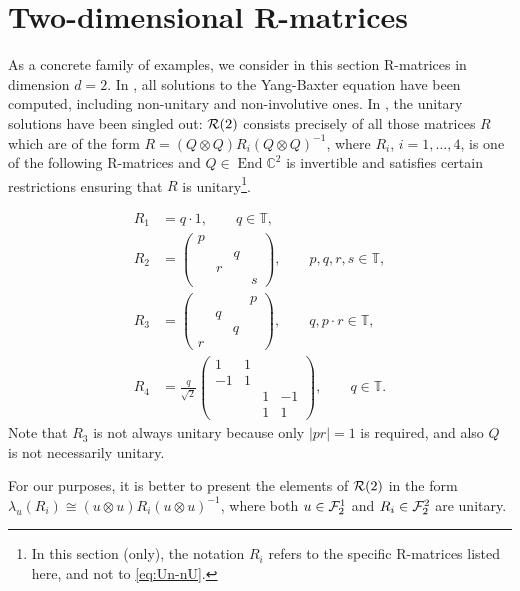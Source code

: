 \documentclass[12pt,a4paper]{amsart}
\numberwithin{equation}{section}
\theoremstyle{remark}
\def\End{\operatorname{End}}
\newcommand{\ot}{\otimes}
\def\C{\mathbb{C}}
\def\T{\mathbb{T}}
\newcommand{\la}{\lambda}
\begin{document}
\section{Two-dimensional R-matrices}\label{section:2dRmatrices}

As a concrete family of examples, we consider in this section R-matrices in dimension $d=2$. In \cite{Hietarinta:1992_8}, all solutions to the Yang-Baxter equation have been computed, including non-unitary and non-involutive ones. In \cite{Dye:2003_2}, the unitary solutions have been singled out: $\mathcal{R}(2)$ consists precisely of all those matrices $R$ which are of the form $R=(Q\ot Q)R_i(Q\ot Q)^{-1}$, where $R_i$, $i=1,\ldots,4$, is one of the following R-matrices and $Q\in\End\C^2$ is invertible and satisfies certain restrictions ensuring that $R$ is unitary\footnote{In this section (only), the notation $R_i$ refers to the specific R-matrices listed here, and not to \eqref{eq:Un-nU}.}.

\begin{align}
 R_1&=q\cdot1,\qquad q\in\T,\\
 R_2
 &=
 \left(
	\begin{array}{cccc}
	 p\\
	 &&q\\
	 &r\\
	 &&&s
	\end{array}
 \right),\qquad p,q,r,s\in\T,
 \\
 R_3
 &=
 \left(
	\begin{array}{cccc}
	 &&&p\\
	 &q\\
	 &&q\\
	 r
	\end{array}
 \right),\qquad q,p\cdot r\in\T,
 \\
 R_4
 &=
 \frac{q}{\sqrt{2}}
        \left(
            \begin{array}{rrrr}
            1 & 1 \\
            -1 & 1 \\
            &&1&-1\\
            &&1 & 1
            \end{array}
        \right),\qquad q\in\T.
		\label{R4}
\end{align}
Note that $R_3$ is not always unitary because only $|pr|=1$ is required, and also $Q$ is not necessarily unitary.

For our purposes, it is better to present the elements of $\mathcal{R}(2)$ in the form $\la_u(R_i)\cong (u\ot u)R_i(u\ot u)^{-1}$, where both $u\in\mathcal{F}_2^1$ and $R_i\in\mathcal{F}_2^2$ are unitary.
\end{document}
